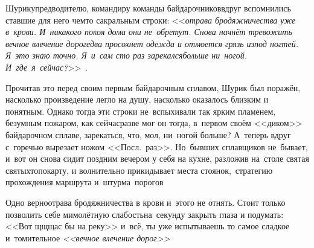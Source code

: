 {{%

Шурику\mdash предводителю, командиру команды байдарочников\mdash вдруг вспомнились ставшие для него чем\sdash то сакральным строки: <<\textit{\myldots отрава бродяжничества уже в~крови. И~никакого покоя дома они не~обретут. Снова начнёт тревожить вечное влечение дорог\mdash едва просохнет одежда и отмоется грязь из\sdash под ногтей. Я~это знаю точно. Я~и~сам сто раз зарекался\mdash больше ни~ногой. И~где~я~сейчас?}>>~\cite{ГеографГлобусПропил}. 

Прочитав это перед своим первым байдарочным сплавом, Шурик был поражён, насколько произведение легло на душу, насколько оказалось близким и понятным. Однако тогда эти строки не~вспыхивали так ярким пламенем, безумным пожаром, как сейчас\mdash разве мог он тогда, в~первом своём <<диком>> байдарочном сплаве, зарекаться, что, мол, ни~ногой больше? А~теперь вдруг с~горечью вырезает ножом <<Посл.~раз>>. Но~бывших сплавщиков не~бывает, и~вот он снова сидит поздним вечером у себя на кухне, разложив на~столе святая святых\mdash топокарту, и волнительно прикидывает места стоянок,~стратегию прохождения маршрута и~штурма~порогов\myldots{} 

Одно верно\mdash отрава бродяжничества в крови и~этого не отнять. Стоит только позволить себе мимолётную слабость\mdash на~секунду закрыть глаза и подумать: <<Вот щ\sdash щ\sdash щас бы на реку\myldots{}>> и~всё, ты уже испытываешь то самое сладкое и~томительное \textit{<<вечное влечение дорог>>}\myldots{}

\begin{center}
\end{center}


\newpage


}

}